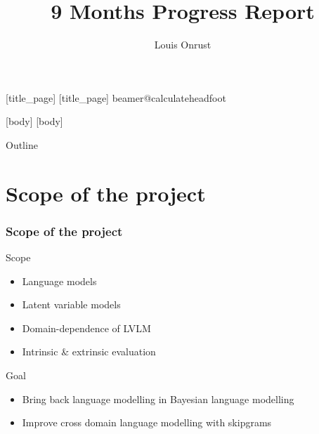 \documentclass[11pt,t]{beamer}
\title{9 Months Progress Report}
\author{Louis Onrust}
\institute{CLS, Radboud University \and ESAT-PSI, KU Leuven}
\begin{document}
    [title_page]
    [title_page]
    \csname beamer@calculateheadfoot\endcsname %
        \begin{frame}
            \titlepage
        \end{frame}
    [body]
    [body]

\begin{frame}{Outline}
    \vskip 5mm
    {\parbox{.95\textwidth}{\tableofcontents[hideallsubsections]}}
\end{frame}

%
%
%
\section{Scope of the project}

\begin{frame}    
    \frametitle{Scope of the project}

    \begin{block}{Scope}
        \begin{itemize}
            \item Language models
            \item Latent variable models
            \item Domain-dependence of LVLM
            \item Intrinsic \& extrinsic evaluation
        \end{itemize}
    \end{block}

    \begin{block}{Goal}
        \begin{itemize}
            \item Bring back language modelling in Bayesian language modelling    
            \item Improve cross domain language modelling with skipgrams
        \end{itemize}
    \end{block}
\end{frame}
\end{document}
